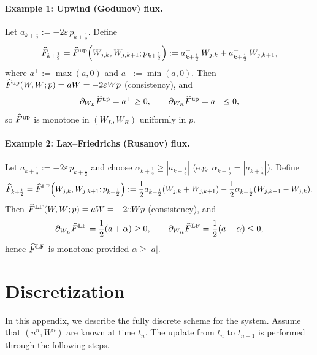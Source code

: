 \documentclass[11pt, dina4, amsfont12]{article}
\begin{document}
\paragraph{Example 1: Upwind (Godunov) flux.}
Let $a_{k+\frac12}:=-2\varepsilon\,p_{k+\frac12}$. Define
\begin{equation}\label{eq:flux_upwind}
\widehat F_{k+\frac12}
=\widehat F^{\rm up}\!\left(W_{j,k},W_{j,k+1};p_{k+\frac12}\right)
:=a_{k+\frac12}^+\,W_{j,k}+a_{k+\frac12}^-\,W_{j,k+1},
\end{equation}
where $a^+:=\max(a,0)$ and $a^-:=\min(a,0)$.
Then $\widehat F^{\rm up}(W,W;p)=aW=-2\varepsilon W p$ (consistency), and
\[
\partial_{W_L}\widehat F^{\rm up}=a^+\ge0,\qquad
\partial_{W_R}\widehat F^{\rm up}=a^-\le0,
\]
so $\widehat F^{\rm up}$ is monotone in $(W_L,W_R)$ uniformly in $p$.

\paragraph{Example 2: Lax--Friedrichs (Rusanov) flux.}
Let $a_{k+\frac12}:=-2\varepsilon\,p_{k+\frac12}$ and choose
$\alpha_{k+\frac12}\ge |a_{k+\frac12}|$ (e.g. $\alpha_{k+\frac12}=|a_{k+\frac12}|$).
Define
\begin{equation}\label{eq:flux_lf}
\widehat F_{k+\frac12}
=\widehat F^{\rm LF}\!\left(W_{j,k},W_{j,k+1};p_{k+\frac12}\right)
:=\frac12 a_{k+\frac12}(W_{j,k}+W_{j,k+1})
-\frac12 \alpha_{k+\frac12}(W_{j,k+1}-W_{j,k}).
\end{equation}
Then $\widehat F^{\rm LF}(W,W;p)=aW=-2\varepsilon W p$ (consistency), and
\[
\partial_{W_L}\widehat F^{\rm LF}=\frac12(a+\alpha)\ge0,\qquad
\partial_{W_R}\widehat F^{\rm LF}=\frac12(a-\alpha)\le0,
\]
hence $\widehat F^{\rm LF}$ is monotone provided $\alpha\ge|a|$.

\section{Discretization}
In this appendix, we describe the fully discrete scheme for the system. Assume that $(u^n, W^n)$ are known at time $t_n$. The update from $t_n$ to $t_{n+1}$ is performed through the following steps.
\end{document}
